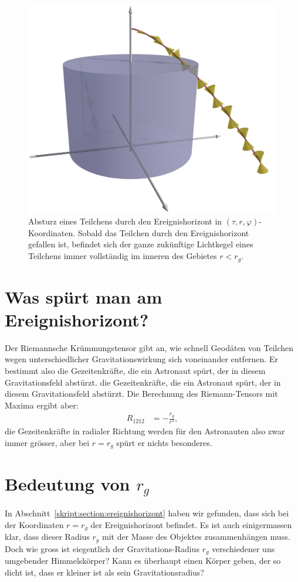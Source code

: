\begin{figure}
\centering
\includegraphics[width=\hsize]{chapters/3d/blackhole.jpg}
\caption{Absturz eines Teilchens durch den Ereignishorizont in
$(\tau,r,\varphi)$-Koordinaten.
Sobald das Teilchen durch den Ereignishorizont gefallen ist,
befindet sich der ganze zukünftige Lichtkegel eines Teilchens 
immer vollständig im inneren des Gebietes $r<r_g$.
\label{skript:kruemmung:fig:blackhole}}
\end{figure}


\section{Was spürt man am Ereignishorizont?%
\label{skript:section:wasspuertman}}
Der Riemannsche Krümmungstensor gibt an, wie schnell Geodäten von Teilchen
wegen unterschiedlicher Gravitationswirkung sich voneinander entfernen.
Er bestimmt also die Gezeitenkräfte, die ein Astronaut spürt, der in
diesem Gravitationsfeld abstürzt.
die Gezeitenkräfte, die ein Astronaut spürt, der in
diesem Gravitationsfeld abstürzt.
Die Berechnung des Riemann-Tensors mit Maxima ergibt aber:
\begin{align*}
R_{1212}&=-\frac{r_g}{r^3},
\end{align*}
die Gezeitenkräfte in radialer Richtung werden für den Astronauten
also zwar immer grösser, aber bei $r=r_g$ spürt er nichts besonderes.

\section{Bedeutung von $r_g$}
In Abschnitt~\ref{skript:section:ereignishorizont} haben wir gefunden,
dass sich bei der Koordinaten $r=r_g$ der Ereignishorizont befindet.
Es ist auch einigermassen klar, dass dieser Radius $r_g$ mit der
Masse des Objektes zusammenhängen muss.
Doch wie gross ist eiegentlich der Gravitations-Radius $r_g$ verschiedener
uns umgebender Himmelskörper? Kann es überhaupt einen Körper geben, der
so dicht ist, dass er kleiner ist als sein Gravitationsradius?

